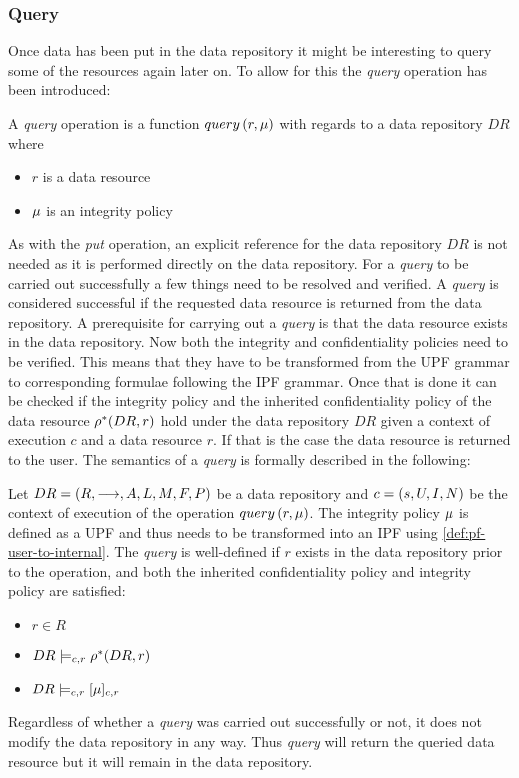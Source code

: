 \subsubsection{Query}\label{sec:query}
Once data has been put in the data repository it might be interesting to query some of the resources again later on. To allow for this the \emph{query} operation has been introduced:
\begin{definition}
A \emph{query} operation is a function $query \left( r, \mu \right)$ with regards to a data repository $DR$ where
\begin{itemize}
  \item $r$ is a data resource
  \item $\mu$ is an integrity policy
\end{itemize}
\end{definition}
As with the \emph{put} operation, an explicit reference for the data repository $DR$ is not needed as it is performed directly on the data repository. For a \emph{query} to be carried out successfully a few things need to be resolved and verified. A \emph{query} is considered successful if the requested data resource is returned from the data repository. A prerequisite for carrying out a \emph{query} is that the data resource exists in the data repository. Now both the integrity and confidentiality policies need to be verified. This means that they have to be transformed from the UPF grammar to corresponding formulae following the IPF grammar. Once that is done it can be checked if the integrity policy and the inherited confidentiality policy of the data resource $\rho^{\ast}(DR,r)$ hold under the data repository $DR$ given a context of execution $c$ and a data resource $r$. If that is the case the data resource is returned to the user.
The semantics of a \emph{query} is formally described in the following:
\begin{definition}
Let $DR= \left( R, \longrightarrow, A, L, M, F, P \right)$ be a data repository and $c = \left( s, U, I, N \right)$ be the context of execution of the operation $query \left( r, \mu \right)$. The integrity policy $\mu$ is defined as a UPF and thus needs to be transformed into an IPF using \autoref{def:pf-user-to-internal}.
The \emph{query} is well-defined if $r$ exists in the data repository prior to the operation, and both the inherited confidentiality policy and integrity policy are satisfied:
\begin{itemize}
    \item $r \in R$
    \item $DR \models_{c,r} \rho^{\ast}(DR, r)$
    \item $DR \models_{c,r} [\mu]_{c,r}$
\end{itemize}
\end{definition}

Regardless of whether a \emph{query} was carried out successfully or not, it does not modify the data repository in any way. Thus \emph{query} will return the queried data resource but it will remain in the data repository. 